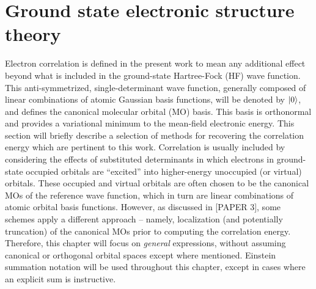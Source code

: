 \section{Ground state electronic structure theory} \label{se:est}
Electron correlation is defined in the present work to mean any additional effect beyond what is
included in the ground-state Hartree-Fock (HF) wave function. This anti-symmetrized, 
single-determinant wave function, generally composed of linear combinations of atomic Gaussian basis functions, will be denoted by $| 0 \rangle$, and defines the canonical molecular orbital (MO) basis.\cite{Szabo1996} 
This basis is orthonormal and provides a variational minimum to the mean-field electronic energy.
This section will briefly describe a selection of methods for recovering the correlation energy which are
pertinent to this work.
Correlation is usually included by considering the effects of substituted determinants in which electrons
in ground-state occupied orbitals are ``excited'' into higher-energy unoccupied (or virtual) orbitals. 
These occupied and virtual orbitals are often chosen to be the canonical MOs of the reference 
wave function, which in turn are linear combinations of atomic orbital basis functions.
However, as discussed in [PAPER 3], some schemes apply a different approach -- namely, localization
(and potentially truncation) of the canonical MOs prior to computing the correlation energy. 
Therefore, this chapter will focus on \textit{general} expressions, without assuming canonical or 
orthogonal orbital spaces except where mentioned.   
Einstein summation notation will be used throughout this chapter, except in cases where an explicit sum
is instructive.

